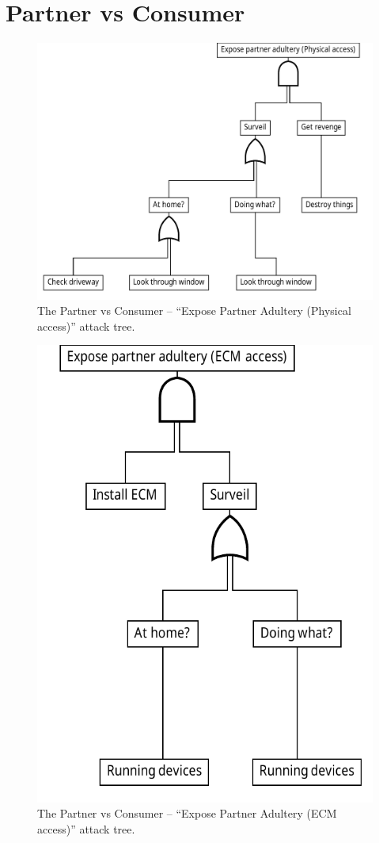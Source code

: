 
\section{Partner vs Consumer}

\begin{figure}[h]
  \centering
	\includegraphics[width=.75\textwidth]{figures/graphviz/partner_vs_consumer_physical.pdf}
	\caption{The Partner vs Consumer -- ``Expose Partner Adultery (Physical access)'' attack tree.}
	\label{fig:attack_trees:partner:cheater_physical}
\end{figure}

\begin{figure}[h]
  \centering
  \includegraphics[width=.5\textwidth]{figures/graphviz/partner_vs_consumer_ecm.pdf}
  \caption{The Partner vs Consumer -- ``Expose Partner Adultery (ECM access)'' attack tree.}
  \label{fig:attack_trees:partner:cheater_ecm}
\end{figure}

